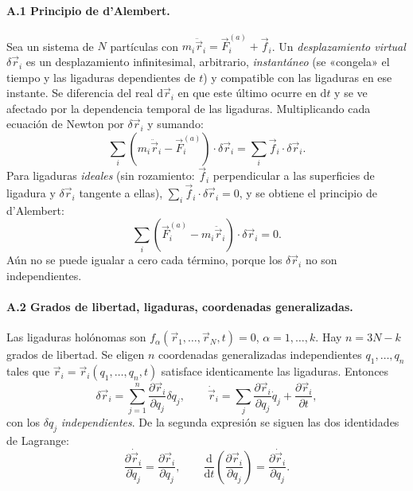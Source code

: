 \documentclass[11pt,a4paper]{article}
\newcommand{\dd}{\mathrm{d}}
\newcommand{\pd}[2]{\dfrac{\partial #1}{\partial #2}}
\newcommand{\ddt}[1]{\dfrac{\dd #1}{\dd t}}
\begin{document}
\paragraph{A.1 Principio de d'Alembert.}
Sea un sistema de $N$ partículas con $m_i\ddot{\vec r}_i=\vec F_i^{(a)}+\vec f_i$. Un \emph{desplazamiento virtual} $\delta\vec r_i$ es un desplazamiento infinitesimal, arbitrario,
\emph{instantáneo} (se «congela» el tiempo y las ligaduras dependientes de $t$) y compatible con las ligaduras en ese instante. Se diferencia del real $\dd\vec r_i$ en que este último ocurre en $\dd t$ y se ve afectado por la dependencia temporal
de las ligaduras. Multiplicando cada ecuación de Newton por $\delta\vec r_i$ y sumando:
\begin{equation}
 \sum_i\left(m_i\ddot{\vec r}_i-\vec F_i^{(a)}\right)\cdot\delta\vec r_i=\sum_i\vec f_i\cdot\delta\vec r_i .
\end{equation}
Para ligaduras \emph{ideales} (sin rozamiento: $\vec f_i$ perpendicular a las superficies de ligadura y $\delta\vec r_i$ tangente a ellas), $\sum_i\vec f_i\cdot\delta\vec r_i=0$, y se obtiene el principio de d'Alembert:
\begin{equation}
 \sum_i\left(\vec F_i^{(a)}-m_i\ddot{\vec r}_i\right)\cdot\delta\vec r_i=0 .\tag{A.1}
\end{equation}
Aún no se puede igualar a cero cada término, porque los $\delta\vec r_i$ no son independientes.

\paragraph{A.2 Grados de libertad, ligaduras, coordenadas generalizadas.}
Las ligaduras holónomas son $f_\alpha(\vec r_1,\ldots,\vec r_N,t)=0$, $\alpha=1,\ldots,k$. Hay $n=3N-k$ grados de libertad. Se eligen $n$ coordenadas generalizadas independientes $q_1,\ldots,q_n$ tales que
$\vec r_i=\vec r_i(q_1,\ldots,q_n,t)$ satisface identicamente las ligaduras. Entonces
\begin{equation}
 \delta\vec r_i=\sum_{j=1}^n\pd{\vec r_i}{q_j}\delta q_j,\qquad \dot{\vec r}_i=\sum_j\pd{\vec r_i}{q_j}\dot q_j+\pd{\vec r_i}{t},
\end{equation}
con los $\delta q_j$ \emph{independientes}. De la segunda expresión se siguen las dos identidades de Lagrange:
\begin{equation}
 \pd{\dot{\vec r}_i}{\dot q_j}=\pd{\vec r_i}{q_j},\qquad \ddt{}\!\left(\pd{\vec r_i}{q_j}\right)=\pd{\dot{\vec r}_i}{q_j}.\tag{A.2}
\end{equation}
\end{document}
